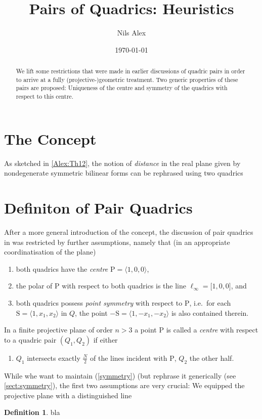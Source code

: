 \documentclass[12pt,english,paper=a4,DIV=12,headings=small,numbers=noenddot,parskip=half]{scrartcl}
\theoremstyle{definition}
\newtheorem{defi}{Definition}[section]
\begin{document}
\title{Pairs of Quadrics: Heuristics}
\author{Nils Alex}
\date{\today}

\maketitle

\begin{abstract}
We lift some restrictions that were made in earlier discussions of quadric pairs in order to arrive at a fully (projective-)geometric treatment. Two generic properties of these pairs are proposed: Uniqueness of the centre and symmetry of the quadrics with respect to this centre.
\end{abstract}

\section{The Concept}

As sketched in \ref{Alex:Th12}, the notion of \emph{distance} in the real plane given by nondegenerate symmetric bilinear forms can be rephrased using two quadrics

\section{Definiton of Pair Quadrics}

After a more general introduction of the concept, the discussion of pair quadrics in \cite{Alex:Th12} was restricted by further assumptions, namely that (in an appropriate coordinatisation of the plane)
\begin{enumerate}[i]
\item{both quadrics have the \emph{centre} $\mathrm{P}=\langle1,0,0\rangle$,}
\item{the polar of $\mathrm{P}$ with respect to both quadrics is the line $\ell_\infty=\lbrack1,0,0\rbrack$, and}
\item{both quadrics possess \emph{point symmetry} with respect to $\mathrm{P}$, i.e.\ for each $\mathrm{S}=\langle1,x_1,x_2\rangle$ in $Q$, the point $\mathrm{-S}=\langle1,-x_1,-x_2\rangle$ is also contained therein.\label{symmetry}}
\end{enumerate}

In a finite projective plane of order $n>3$ a point $\mathrm{P}$ is called a \emph{centre} with respect to a quadric pair $(Q_1,Q_2)$ if either
\begin{enumerate}[{i}a]
\item{$Q_1$ intersects exactly $\frac{N}{2}$ of the lines incident with $\mathrm{P}$, $Q_2$ the other half. }
\end{enumerate}

While whe want to maintain (\ref{symmetry}) (but rephrase it generically (see \ref{sect:symmetry}), the first two assumptions are very crucial: We equipped the projective plane with a distinguished line

\begin{defi}
bla
\end{defi}
\end{document}

